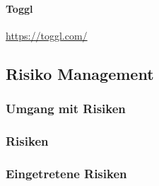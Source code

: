 \paragraph{Toggl} \href{https://toggl.com/}{https://toggl.com/}
 
\subsection{Risiko Management}

\subsubsection{Umgang mit Risiken}


\subsubsection{Risiken}


\subsubsection{Eingetretene Risiken}
